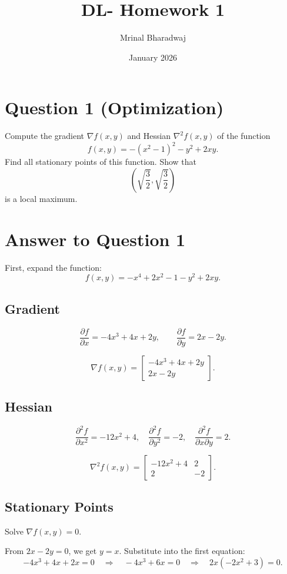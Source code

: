 \documentclass{article}
\title{DL- Homework 1}
\author{Mrinal Bharadwaj}
\date{January 2026}
\begin{document}
\maketitle


\section*{Question 1 (Optimization)}

Compute the gradient $\nabla f(x,y)$ and Hessian $\nabla^2 f(x,y)$ of the function
\[
f(x,y)=-(x^2-1)^2-y^2+2xy.
\]
Find all stationary points of this function. Show that
\[
\left(\sqrt{\frac{3}{2}},\sqrt{\frac{3}{2}}\right)
\]
is a local maximum.

\section*{Answer to Question 1}

First, expand the function:
\[
f(x,y)=-x^4+2x^2-1-y^2+2xy.
\]

\subsection*{Gradient}
\[
\frac{\partial f}{\partial x}=-4x^3+4x+2y,
\qquad
\frac{\partial f}{\partial y}=2x-2y.
\]

\[
\nabla f(x,y)=
\begin{bmatrix}
-4x^3+4x+2y\\
2x-2y
\end{bmatrix}.
\]

\subsection*{Hessian}
\[
\frac{\partial^2 f}{\partial x^2}=-12x^2+4,
\quad
\frac{\partial^2 f}{\partial y^2}=-2,
\quad
\frac{\partial^2 f}{\partial x\partial y}=2.
\]

\[
\nabla^2 f(x,y)=
\begin{bmatrix}
-12x^2+4 & 2\\
2 & -2
\end{bmatrix}.
\]

\subsection*{Stationary Points}

Solve $\nabla f(x,y)=0$.

From $2x-2y=0$, we get $y=x$.
Substitute into the first equation:
\[
-4x^3+4x+2x=0
\quad\Rightarrow\quad
-4x^3+6x=0
\quad\Rightarrow\quad
2x(-2x^2+3)=0.
\]
\end{document}
